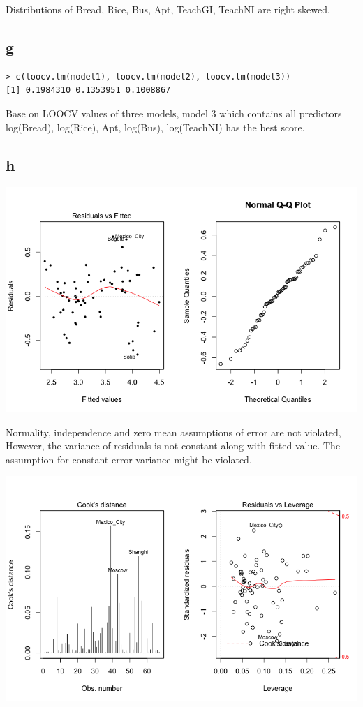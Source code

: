 \documentclass[11pt,letterpaper]{article}
\begin{document}
\noindent Distributions of Bread, Rice, Bus, Apt, TeachGI, TeachNI are right skewed.

\subsection*{g}
\begin{verbatim}
> c(loocv.lm(model1), loocv.lm(model2), loocv.lm(model3))
[1] 0.1984310 0.1353951 0.1008867
\end{verbatim}

\noindent Base on LOOCV values of three models, model 3 which contains all predictors log(Bread), log(Rice), Apt, log(Bus), log(TeachNI) has the best score. 

\subsection*{h}
\includegraphics[scale=0.5]{2-h-1.png}

\noindent Normality, independence and zero mean assumptions of error are not violated, However, the variance of residuals is not constant along with fitted value. The assumption for constant error variance might be violated. 

\includegraphics[scale=0.5]{2-h-2.png}
\end{document}
